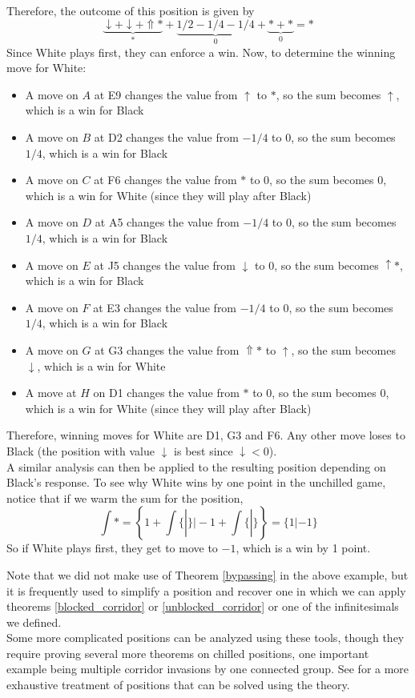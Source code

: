\documentclass[../math194_paper.tex]{subfiles}
\begin{document}
Therefore, the outcome of this position is given by 
\[
    \underbrace{\downarrow + \downarrow + \Uparrow*}_{*} + \underbrace{1/2 - 1/4 - 1/4}_{0} +\underbrace{* + *}_{0} = *
\]
Since White plays first, they can enforce a win. Now, to determine the winning move for White:
\begin{itemize}
    \item A move on $A$ at E9 changes the value from $\uparrow$ to $*$, so the sum becomes $\uparrow$, which 
    is a win for Black
    \item A move on $B$ at D2 changes the value from $-1/4$ to $0$, so the sum becomes $1/4$, which is a win for Black
    \item A move on $C$ at F6 changes the value from $*$ to $0$, so the sum becomes $0$, which is a win for White 
    (since they will play after Black)
    \item A move on $D$ at A5 changes the value from $-1/4$ to $0$, so the sum becomes $1/4$, which is a win for 
    Black
    \item A move on $E$ at J5 changes the value from $\downarrow$ to $0$, so the sum becomes $\uparrow *$, which 
    is a win for Black
    \item A move on $F$ at E3 changes the value from $-1/4$ to $0$, so the sum becomes $1/4$, which is a win 
    for Black
    \item A move on $G$ at G3 changes the value from $\Uparrow*$ to $\uparrow$, so the sum becomes $\downarrow$,
    which is a win for White
    \item A move at $H$ on D1 changes the value from $*$ to $0$, so the sum becomes $0$, which is a win for 
    White (since they will play after Black)
\end{itemize}
Therefore, winning moves for White are D1, G3 and F6. Any other move loses to Black 
(the position with value $\downarrow$ is best since $\downarrow < 0$). \\
A similar analysis can then be applied to the resulting position depending on Black's response.
To see why White wins by one point in the unchilled game, notice that if we warm the sum for the position,
\[
    \int * = \left\{ 1 + \int \{ | \} \Bigg| -1 + \int \{ | \} \right\} = \{ 1 | -1 \}
\]
So if White plays first, they get to move to $-1$, which is a win by 1 point.

Note that we did not make use of Theorem \ref{bypassing} in the above example, 
but it is frequently used to simplify a position and recover one in which we can 
apply theorems \ref{blocked_corridor} or \ref{unblocked_corridor} or one of the infinitesimals 
we defined. \\

Some more complicated positions can be analyzed using these tools, though
they require proving several more theorems on chilled positions, one important 
example being multiple corridor invasions by one connected group. 
See \cite[\S 4]{berlekamp1994mathematical} for a more exhaustive treatment of
positions that can be solved using the theory.
\end{document}
